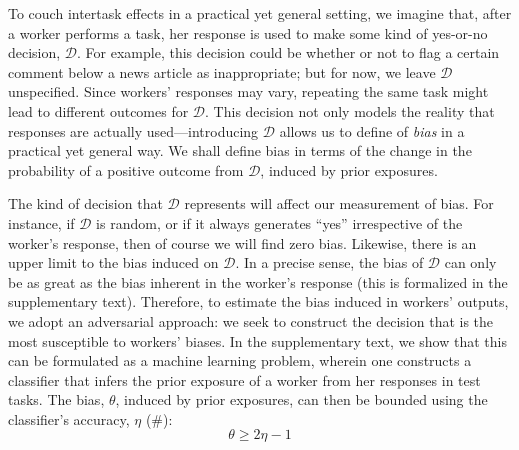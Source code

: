 \documentclass[12pt]{article}
\begin{document}
To couch intertask effects in a practical yet general setting, we imagine
that, after a worker performs a task, her response is used to make some 
kind of yes-or-no decision, $\mathcal{D}$.  For example, this decision 
could be whether or not to flag a certain comment
below a news article as inappropriate; but for now, we leave 
$\mathcal{D}$ unspecified.  Since workers' responses may
vary, repeating the same task might lead to different outcomes for 
$\mathcal{D}$.  This decision not only models the reality that responses are
actually used---introducing $\mathcal{D}$ allows us to define of \textit{bias}
in a practical yet general way. We shall define bias in terms of the
change in the probability of a positive outcome from $\mathcal{D}$, induced 
by prior exposures.

The kind of decision that $\mathcal{D}$ represents will affect our 
measurement of bias.  For instance, if $\mathcal{D}$ is random, or if 
it always generates ``yes'' 
irrespective of the worker's response, then of course we will 
find zero bias.  Likewise, there is an upper limit to the bias induced on $\mathcal{D}$. In a precise sense, the bias of $\mathcal{D}$ can only be as
great as the bias inherent in the worker's response 
(this is formalized in the supplementary text).  Therefore, to estimate the 
bias induced in workers' outputs, we adopt an 
adversarial approach: we seek to construct the decision that 
is the most susceptible to workers' biases. In the supplementary text, we 
show that this can be formulated as a  machine learning problem, wherein one
constructs a classifier that infers the prior exposure of a worker from her 
responses in test tasks.  The bias, $\theta$, induced by 
prior exposures, can then be bounded using the classifier's accuracy, 
$\eta$ (\#):
\begin{equation}
	\theta \geq 2\eta - 1
	\label{l1}
\end{equation}
\end{document}
